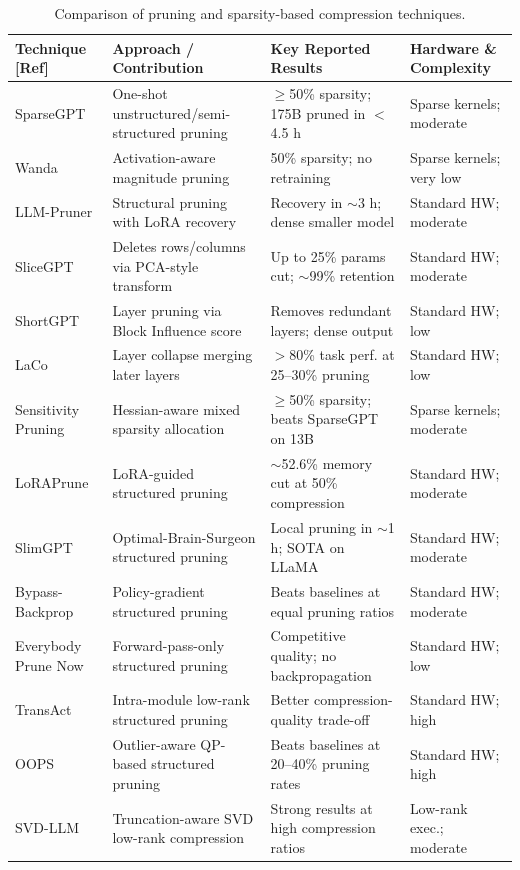 \documentclass[
11pt, %
english, %
singlespacing, %
headsepline, %
]{MastersDoctoralThesis} %
\begin{document}
\begin{table}[htbp]
\centering
\scriptsize
\caption{Comparison of pruning and sparsity-based compression techniques.}
\label{tab:lr-prune}
\renewcommand{\arraystretch}{1.2}
\begin{tabular}{p{}p{}p{}p{}}
\hline
\textbf{Technique [Ref]} & \textbf{Approach / Contribution} & \textbf{Key Reported Results} & \textbf{Hardware \& Complexity} \\
\hline
SparseGPT \cite{frantar2023sparsegpt} & One-shot unstructured/semi-structured pruning & $\geq$50\% sparsity; 175B pruned in $<$4.5 h & Sparse kernels; moderate \\
Wanda \cite{sun2024wanda} & Activation-aware magnitude pruning & 50\% sparsity; no retraining & Sparse kernels; very low \\
LLM-Pruner \cite{ma2023llmpruner} & Structural pruning with LoRA recovery & Recovery in $\sim$3 h; dense smaller model & Standard HW; moderate \\
SliceGPT \cite{ashkboos2024slicegpt} & Deletes rows/columns via PCA-style transform & Up to 25\% params cut; $\sim$99\% retention & Standard HW; moderate \\
ShortGPT \cite{men2024shortgpt} & Layer pruning via Block Influence score & Removes redundant layers; dense output & Standard HW; low \\
LaCo \cite{yang2024laco} & Layer collapse merging later layers & $>$80\% task perf. at 25--30\% pruning & Standard HW; low \\
Sensitivity Pruning \cite{shao2024sensitivity} & Hessian-aware mixed sparsity allocation & $\geq$50\% sparsity; beats SparseGPT on 13B & Sparse kernels; moderate \\
LoRAPrune \cite{zhang2024loraprune} & LoRA-guided structured pruning & $\sim$52.6\% memory cut at 50\% compression & Standard HW; moderate \\
SlimGPT \cite{ling2024slimgpt} & Optimal-Brain-Surgeon structured pruning & Local pruning in $\sim$1 h; SOTA on LLaMA & Standard HW; moderate \\
Bypass-Backprop \cite{gao2025bypass} & Policy-gradient structured pruning & Beats baselines at equal pruning ratios & Standard HW; moderate \\
Everybody Prune Now \cite{kolawole2026bonsai} & Forward-pass-only structured pruning & Competitive quality; no backpropagation & Standard HW; low \\
TransAct \cite{shen2024transact} & Intra-module low-rank structured pruning & Better compression-quality trade-off & Standard HW; high \\
OOPS \cite{survey2026oops} & Outlier-aware QP-based structured pruning & Beats baselines at 20--40\% pruning rates & Standard HW; high \\
SVD-LLM \cite{wang2025svdllm} & Truncation-aware SVD low-rank compression & Strong results at high compression ratios & Low-rank exec.; moderate \\
\hline
\end{tabular}
\end{table}
\end{document}
